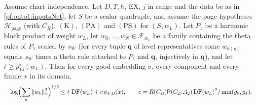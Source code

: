 \begin{theorem}\label{pf:onto1:frames}
Assume chart independence. Let $D,T,h$, $\mathrm{EX}$, $j$ in range and the data be as in \cref{pf:onto1:inputsNet}, let $S$ be a
scalar quadruple, and assume the page hypotheses $\mathcal H_{\mathrm{page}}$ (with $C_R$), $(\mathrm K)$, $(\mathrm{PA})$ and $(\mathrm{PS})$ for
$(S,w_L)$. Let $P_1$ be a harmonic block product of weight $w_L$, let $w_0,\dots,w_N\in\mathcal F_{w_L}$ be a family containing the
theta rules of $P_1$ scaled by $s_W$ (for every tuple $\mathbf q$ of level representatives some $w_{k(\mathbf q)}$ equals $s_W$ times a
theta rule attached to $P_1$ and $\mathbf q$, injectively in $\mathbf q$), and let $t\ge p^\circ_{14}(w_L)$. Then for every good embedding
$\sigma$, every component and every frame $x$ in its domain,
\[
-\log\Bigl(\sum_k\|w_k\|_x^2\Bigr)^{1/2}\le t\,\operatorname{DF}(w_L)+c\,\phi_{FD}(x),\qquad c=R(C_R)\mathsf{P}(C_2,A_2)\operatorname{DF}(w_L)^2/\min(g_0,g_1).
\]
\end{theorem}

